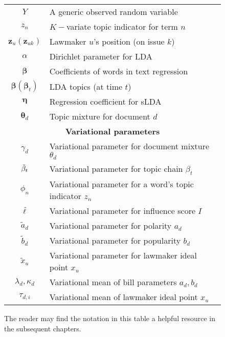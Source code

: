 \begin{figure*}
\begin{tabular}{|c|l|}
      $Y$ & A generic observed random variable \\
      $z_n$ & $K-$variate topic indicator for term $n$ \\
      $\bm z_u (\bm z_{uk})$ & Lawmaker $u$'s position (on issue $k$) \\
      $\alpha$ & Dirichlet parameter for LDA \\
      $\bm \beta$ & Coefficients of words in text regression \\
      $\bm \beta (\bm \beta_t)$ & LDA topics (at time $t$) \\
      $\bm \eta$ & Regression coefficient for sLDA \\
      $\bm \theta_d$ & Topic mixture for document $d$ \\
      \hline
      \multicolumn{2}{|c|}{\textbf{Variational parameters}} \\
      \hline
      $\gamma_d$ & Variational parameter for document mixture $\theta_d$ \\
      $\tilde{\beta}_t$ & Variational parameter for topic chain $\beta_t$ \\
      $\phi_n$ & Variational parameter for a word's topic indicator $z_n$ \\
      $\tilde{\ell}$ & Variational parameter for influence score $I$ \\
      $\tilde a_d$ & Variational parameter for polarity $a_d$ \\
      $\tilde b_d$ & Variational parameter for popularity $b_d$ \\
      $\tilde x_u$ & Variational parameter for lawmaker ideal point $x_u$ \\
      $\lambda_{d}, \kappa_{d}$ & Variational mean of bill parameters $a_d, b_d$
      \\
      $\tau_{d,i}$ & Variational mean of lawmaker ideal point $x_u$ \\
      \hline
    \end{tabular}
\caption{The reader may find the notation in this table a helpful resource in the
 subsequent chapters.}
  \label{fig:notation}
\end{figure*}
